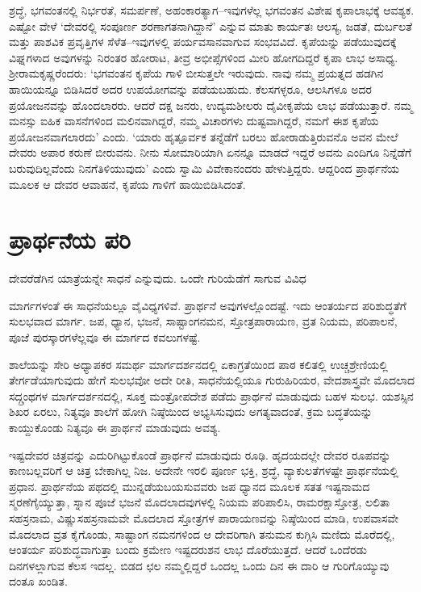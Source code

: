 ಶ್ರದ್ಧೆ, ಭಗವಂತನಲ್ಲಿ ನಿರ್ಭರತೆ, ಸಮರ್ಪಣೆ, ಅಹಂಕಾರತ್ಯಾಗ–ಇವುಗಳೆಲ್ಲ ಭಗವಂತನ ವಿಶೇಷ ಕೃಪಾಲಾಭಕ್ಕೆ ಆವಶ್ಯಕ. ಎಷ್ಟೋ ವೇಳೆ ‘ದೇವರಲ್ಲಿ ಸಂಪೂರ್ಣ ಶರಣಾಗತನಾಗಿದ್ದಾನೆ’ ಎನ್ನುವ ಮಾತು ಕಾರ್ಯತಃ ಆಲಸ್ಯ, ಜಡತೆ, ದುರ್ಬಲತೆ ಮತ್ತು ಪಾಶವಿಕ ಪ್ರವೃತ್ತಿಗಳ ಸೆಳೆತ–ಇವುಗಳಲ್ಲಿ ಪರ್ಯವಸಾನವಾಗುವ ಸಂಭವವಿದೆ. ಕೃಪೆಯನ್ನು ಪಡೆಯುವುದಕ್ಕೆ ವಿಘ್ನಗಳಾದ ಅವುಗಳನ್ನು ನಿರಂತರ ಹೋರಾಟ, ತೀವ್ರ ಅಭೀಪ್ಸೆಗಳಿಂದ ಮೀರಿ ಹೋಗದಿದ್ದರೆ ಕೃಪಾ ಲಾಭ ಅಸಾಧ್ಯ. ಶ‍್ರೀರಾಮಕೃಷ್ಣರೆಂದರು: ‘ಭಗವಂತನ ಕೃಪೆಯ ಗಾಳಿ ಬೀಸುತ್ತಲೇ ಇರುವುದು. ನಾವು ನಮ್ಮ ಪ್ರಯತ್ನದ ಹಡಗಿನ ಹಾಯಿಯನ್ನೂ ಬಿಡಿಸಿದರೆ ಅದರ ಉಪಯೋಗವನ್ನು ಪಡೆಯಬಹುದು. ಕೆಲಸಗಳ್ಳರೂ, ಆಲಸಿಗಳೂ ಅದರ ಪ್ರಯೋಜನವನ್ನು ಹೊಂದಲಾರರು. ಆದರೆ ದಕ್ಷ ಜನರು, ಉದ್ಯಮಶೀಲರು ದೈವೀಕೃಪೆಯ ಲಾಭ ಪಡೆಯುತ್ತಾರೆ. ನಮ್ಮ ಮನಸ್ಸು ಐಹಿಕ ವಾಸನೆಗಳಿಂದ ಮಲಿನವಾಗಿದ್ದರೆ, ನಮ್ಮ ವಿಚಾರಗಳು ದುಷ್ಟವಾಗಿದ್ದರೆ, ನಮಗೆ ಈಶ ಕೃಪೆಯ ಪ್ರಯೋಜನವಾಗಲಾರದು’ ಎಂದು. ‘ಯಾರು ಹೃತ್ಪೂರ್ವಕ ತನ್ನೆಡೆಗೆ ಬರಲು ಹೋರಾಡುತ್ತಿರುವನೊ ಅವನ ಮೇಲೆ ದೇವರು ಅಪಾರ ಕರುಣೆ ಬೀರುವನು. ನೀನು ಸೋಮಾರಿಯಾಗಿ ಏನನ್ನೂ ಮಾಡದೆ ಇದ್ದರೆ ಅವನು ಎಂದಿಗೂ ನಿನ್ನೆಡೆಗೆ ಬರುವುದಿಲ್ಲವೆಂದು ನಿನಗೆ\break ತಿಳಿಯುವುದು’ ಎಂದು ಸ್ವಾಮಿ ವಿವೇಕಾನಂದರು ಹೇಳುತ್ತಿದ್ದರು. ಆದ್ದರಿಂದ ಪ್ರಾರ್ಥನೆಯ ಮೂಲಕ ಆ ದೇವರ ಆವಾಹನೆ, ಕೃಪೆಯ ಗಾಳಿಗೆ ಹಾಯಿಬಿಡಿಸಿದಂತೆ.


\section*{ಪ್ರಾರ್ಥನೆಯ ಪರಿ}


{\parfillskip=0pt ದೇವರೆಡೆಗಿನ ಯಾತ್ರೆಯನ್ನೇ ಸಾಧನೆ ಎನ್ನುವುದು. ಒಂದೇ ಗುರಿಯೆಡೆಗೆ ಸಾಗುವ ವಿವಿಧ\par}\newpage\noindent ಮಾರ್ಗಗಳಂತೆ ಈ ಸಾಧನೆಯಲ್ಲೂ ವೈವಿಧ್ಯಗಳಿವೆ. ಪ್ರಾರ್ಥನೆ ಅವುಗಳಲ್ಲೊಂದಷ್ಟೆ. ಇದು ಆಂತರ್ಯದ ಪರಿಶುದ್ಧತೆಗೆ ಸುಲಭವಾದ ಮಾರ್ಗ. ಜಪ, ಧ್ಯಾನ, ಭಜನೆ, ಸಾಷ್ಟಾಂಗನಮನ, ಸ್ತೋತ್ರಪಾರಾಯಣ, ವ್ರತ ನಿಯಮ, ಪರಿಪಾಲನೆ, ಪೂಜೆ ಪುರಸ್ಕಾರಗಳೆಲ್ಲವೂ ಈ ಮಾರ್ಗದ ಕವಲುಗಳಷ್ಟೆ.

ಶಾಲೆಯನ್ನು ಸೇರಿ ಅಧ್ಯಾಪಕರ ಸಮರ್ಥ ಮಾರ್ಗದರ್ಶನದಲ್ಲಿ ಏಕಾಗ್ರತೆಯಿಂದ ಪಾಠ ಕಲಿತಲ್ಲಿ ಉಚ್ಚಶ್ರೇಣಿಯಲ್ಲಿ ತೇರ್ಗಡೆಯಾಗುವುದು ಹೇಗೆ ಸುಲಭವೋ ಅದೇ ರೀತಿ, ಸಾಧನೆ\-ಯಲ್ಲಿಯೂ ಗುರುಹಿರಿಯರ, ವೇದಶಾಸ್ತ್ರವೇ ಮೊದಲಾದ ಸದ್ಗ್ರಂಥಗಳ ಮಾರ್ಗದರ್ಶನದಲ್ಲಿ, ಸೂಕ್ತ ಮಂತ್ರೋ\-ಪದೇಶ ಪಡೆದು ಪ್ರಾರ್ಥನೆ ಮಾಡುವುದು ಬಹಳ ಸುಲಭ. ಯಶಸ್ಸಿನ ಶಿಖರ ಏರಲು, ನಿತ್ಯವೂ ಶಾಲೆಗೆ ಹೋಗಿ ನಿಷ್ಠೆಯಿಂದ ಅಭ್ಯಸಿಸುವುದು ಅಗತ್ಯವಾದಂತೆ, ಕ್ರಮ ಬದ್ಧತೆಯನ್ನು ಕಾಯ್ದುಕೊಂಡು ನಿತ್ಯವೂ ಈ ಪ್ರಾರ್ಥನೆ ಮಾಡುವುದು ಅವಶ್ಯ.

ಇಷ್ಟದೇವರ ಚಿತ್ರವನ್ನು ಎದುರಿಗಿಟ್ಟುಕೊಂಡೆ ಪ್ರಾರ್ಥನೆ ಮಾಡುವುದು ರೂಢಿ. ಹೃದಯದಲ್ಲೇ ದೇವರ ರೂಪವನ್ನು ಕಾಣಬಲ್ಲವರಿಗೆ ಆ ಚಿತ್ರ ಬೇಕಾಗಿಲ್ಲ ನಿಜ. ಅದೇನೇ ಇರಲಿ ಪೂರ್ಣ ಭಕ್ತಿ, ಶ್ರದ್ಧೆ, ವ್ಯಾಕುಲತೆಗಳಷ್ಟೇ ಪ್ರಾರ್ಥನೆಯಲ್ಲಿ ಪ್ರಧಾನ. ಪ್ರಾರ್ಥನೆಯ ಪಥದಲ್ಲಿ ಮುನ್ನಡೆಯಬಯಸುವವರು ಜಪ ಧ್ಯಾನದ ಮೂಲಕ ಸತತ ಇಷ್ಟನಾಮದ ಸ್ಮರಣೆಗೈಯ್ಯುತ್ತಾ, ಸ್ನಾನ ಪೂಜೆ ಭಜನೆ ಮೊದಲಾದವುಗಳಲ್ಲಿ ನಿಯಮ ಪರಿಪಾಲಿಸಿ, ರಾಮರಕ್ಷಾಸ್ತೋತ್ರ, ಲಲಿತಾ ಸಹಸ್ರನಾಮ, ವಿಷ್ಣುಸಹಸ್ರನಾಮವೇ ಮೊದಲಾದ ಸ್ತೋತ್ರಗಳ ಪಾರಾಯಣವನ್ನು ನಿಷ್ಠೆಯಿಂದ ಮಾಡಿ, ಉಪವಾಸವೇ ಮೊದಲಾದ ವ್ರತ ಕೈಗೊಂಡು, ಸಾಷ್ಟಾಂಗ ನಮನಗಳಿಂದ ಆ ದೇವರಿಗಾಗಿ ತನುಮನ ಕುಗ್ಗಿಸಿ ಮಣಿದು ಮೊರೆದಲ್ಲಿ, ಆಂತರ್ಯ ಪರಿಶುದ್ಧವಾಗುತ್ತಾ ಬಂದು ಕ್ರಮೇಣ ಇಷ್ಟದರುಶನ ಲಾಭ ದೊರೆಯುತ್ತದೆ. ಆದರೆ ಒಂದೆರಡು ದಿನಗಳಲ್ಲಾಗುವ ಕೆಲಸ ಇದಲ್ಲ. ಬಿಡದ ಛಲ ನಮ್ಮಲ್ಲಿದ್ದರೆ ಒಂದಲ್ಲ ಒಂದು ದಿನ ಈ ದಾರಿ ಆ ಗುರಿಗೊಯ್ಯುವು ದಂತೂ ಖಂಡಿತ.


